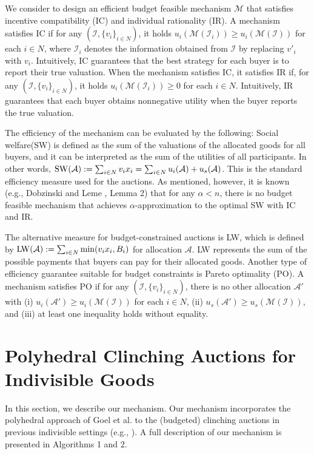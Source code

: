 \documentclass[letterpaper,11pt]{article}
\begin{document}
We consider to design an efficient budget feasible 
mechanism $\mathcal M$ that satisfies incentive compatibility (IC) and individual rationality (IR).
A mechanism satisfies IC if for any $(\mathcal I, \{v_i\}_{i\in N})$, it holds 
$u_i(\mathcal M(\mathcal I_i))\geq  u_i(\mathcal M(\mathcal I))$ for each $i\in N$, where $\mathcal I_i$ denotes the information obtained from $\mathcal I$ by replacing $v'_i$ with $v_i$.
Intuitively, IC guarantees that the best strategy for each buyer is to report their true valuation.
When the mechanism satisfies IC, it satisfies IR if, for any $(\mathcal I, \{v_i\}_{i\in N})$, it holds $u_i(\mathcal M(\mathcal I_i))\geq 0$ for each $i\in N$.
Intuitively, IR guarantees that each buyer obtains nonnegative utility when the buyer reports the true valuation.


The efficiency of the mechanism can be evaluated by the following:
Social welfare(SW) is defined as the sum of the valuations of the allocated goods for all buyers, and 
it can be interpreted as the sum of the utilities of all participants.
In other words, ${\rm SW}(\mathcal A):=\sum_{i\in N}v_i x_i=\sum_{i\in N}u_i (\mathcal A)+u_s(\mathcal A)$.
This is the standard efficiency measure used for the auctions. 
As mentioned, however, it is known (e.g., Dobzinski and Leme \cite{DL2014}, Lemma 2) that for any $\alpha<n$, there is no budget feasible mechanism that achieves $\alpha$-approximation to the optimal SW with IC and IR.

The alternative measure for budget-constrained auctions is LW, which is
defined by ${\rm LW}(\mathcal A):=\sum_{i\in N}\min(v_i x_i, B_i)$ for allocation $\mathcal A$.
LW represents the sum of the possible payments that buyers can pay for their allocated goods.
Another type of efficiency guarantee suitable for budget constraints is Pareto optimality (PO).
A mechanism satisfies PO if for any $(\mathcal I, \{v_i\}_{i\in N})$, there is no other allocation $\mathcal A'$ with (i) $u_i(\mathcal A')\geq u_i(\mathcal M(\mathcal I))$ for each $i\in N$, 
(ii) $u_s(\mathcal A')\geq u_s(\mathcal M(\mathcal I))$, and (iii) at least one inequality holds without equality.

\section{Polyhedral Clinching Auctions for Indivisible Goods}
In this section, we describe our mechanism. Our mechanism  
incorporates the polyhedral approach of Goel et al. \cite{GMP2015} to the (budgeted) clinching auctions in previous indivisible settings  
 (e.g., \cite{BHLS2015, DLN2012, FLSS2011}).
A full description of our mechanism is presented in Algorithms 1 and 2.
\end{document}
